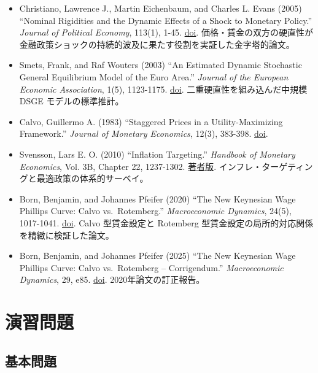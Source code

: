\documentclass[
  japanese,
  lualatex,
  ja=standard,
  12pt,
  a4paper]{ltjsarticle}
\providecommand{\tightlist}{%
  \setlength{\itemsep}{0pt}\setlength{\parskip}{0pt}}
\begin{document}
\begin{itemize}
\tightlist
\item
  Christiano, Lawrence J., Martin Eichenbaum, and Charles L. Evans
  (2005) ``Nominal Rigidities and the Dynamic Effects of a Shock to
  Monetary Policy.'' \emph{Journal of Political Economy}, 113(1), 1-45.
  \href{https://doi.org/10.1086/426038}{doi}.
  価格・賃金の双方の硬直性が金融政策ショックの持続的波及に果たす役割を実証した金字塔的論文。
\item
  Smets, Frank, and Raf Wouters (2003) ``An Estimated Dynamic Stochastic
  General Equilibrium Model of the Euro Area.'' \emph{Journal of the
  European Economic Association}, 1(5), 1123-1175.
  \href{https://doi.org/10.1162/154247603770383415}{doi}.
  二重硬直性を組み込んだ中規模 DSGE モデルの標準推計。
\item
  Calvo, Guillermo A. (1983) ``Staggered Prices in a Utility-Maximizing
  Framework.'' \emph{Journal of Monetary Economics}, 12(3), 383-398.
  \href{https://doi.org/10.1016/0304-3932(83)90060-0}{doi}.
\item
  Svensson, Lars E. O. (2010) ``Inflation Targeting.'' \emph{Handbook of
  Monetary Economics}, Vol. 3B, Chapter 22, 1237-1302.
  \href{https://larseosvensson.se/files/papers/HandbookIT.pdf}{著者版}.
  インフレ・ターゲティングと最適政策の体系的サーベイ。
\item
  Born, Benjamin, and Johannes Pfeifer (2020) ``The New Keynesian Wage
  Phillips Curve: Calvo vs.~Rotemberg.'' \emph{Macroeconomic Dynamics},
  24(5), 1017-1041.
  \href{https://doi.org/10.1017/S1365100518000615}{doi}. Calvo
  型賃金設定と Rotemberg
  型賃金設定の局所的対応関係を精緻に検証した論文。
\item
  Born, Benjamin, and Johannes Pfeifer (2025) ``The New Keynesian Wage
  Phillips Curve: Calvo vs.~Rotemberg -- Corrigendum.''
  \emph{Macroeconomic Dynamics}, 29, e85.
  \href{https://doi.org/10.1017/S1365100525000161}{doi}.
  2020年論文の訂正報告。
\end{itemize}

\Needspace{0.35\textheight}

\section{演習問題}\label{ux6f14ux7fd2ux554fux984c}

\subsection{基本問題}\label{ux57faux672cux554fux984c}
\end{document}
